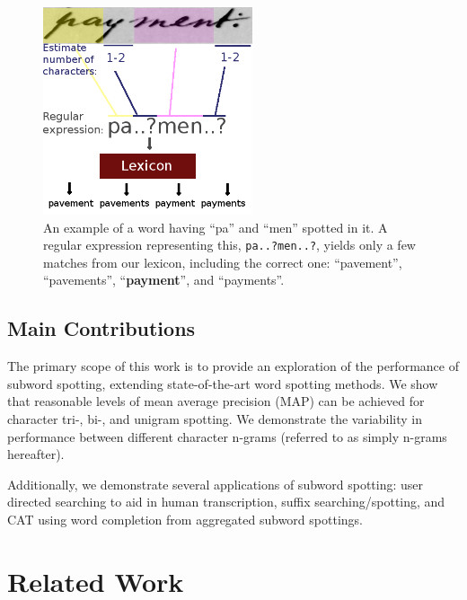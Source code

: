 \documentclass[ms,electronic,twosidetoc,letterpaper,chaptercenter,parttop,lol,lof,lot]{byumsphd}
\begin{document}
\begin{figure}
    \centering
    \includegraphics[width=0.55\textwidth]{spotting_completion_payment}
    \caption{An example of a word having ``pa'' and ``men'' spotted in it. A regular expression representing this, \texttt{pa..?men..?}, yields only a few matches from our lexicon, including the correct one: ``pavement'', ``pavements'', ``\textbf{payment}'', and ``payments''.}
    \label{fig:subtransexample}
\end{figure}


\section{Main Contributions}

The primary scope of this work is to provide an exploration of the performance of subword spotting, extending state-of-the-art word spotting methods.
We show that reasonable levels of mean average precision (MAP) can be achieved for character tri-, bi-, and unigram spotting. We demonstrate the variability in performance between different character n-grams (referred to as simply n-grams hereafter).

Additionally, we demonstrate several applications of subword spotting: user directed searching to aid in human transcription, suffix searching/spotting, and CAT using word completion from aggregated subword spottings.

\chapter{Related Work}\label{relatedword}
\end{document}
